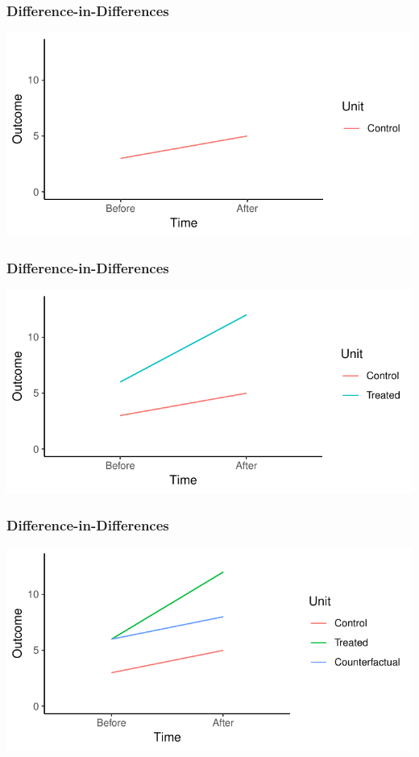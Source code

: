 \documentclass[xcolor=x11names,compress]{beamer}\usepackage[]{graphicx}\usepackage[]{color}
\makeatletter
\def\maxwidth{ %
  \ifdim\Gin@nat@width>\linewidth
    \linewidth
  \else
    \Gin@nat@width
  \fi
}
\newenvironment{knitrout}{}{} %
\renewcommand{\(}{\begin{columns}}
\renewcommand{\)}{\end{columns}}
\newcommand{\<}[1]{\begin{column}{#1}}
\renewcommand{\>}{\end{column}}
\makeatother
\begin{document}
\begin{frame}
\frametitle{Difference-in-Differences}
\begin{knitrout}
\color{fgcolor}
\includegraphics[width=\maxwidth]{figure/DinD_chart1-1} 

\end{knitrout}
\end{frame}


\begin{frame}
\frametitle{Difference-in-Differences}
\begin{knitrout}
\color{fgcolor}
\includegraphics[width=\maxwidth]{figure/DinD_chart1b-1} 

\end{knitrout}
\end{frame}

\begin{frame}
\frametitle{Difference-in-Differences}
\begin{knitrout}
\color{fgcolor}
\includegraphics[width=\maxwidth]{figure/DinD_chart1c-1} 

\end{knitrout}
\end{frame}
\end{document}

